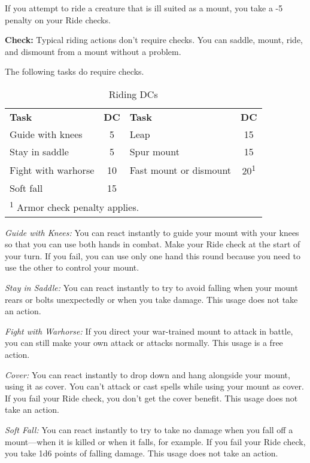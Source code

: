
If you attempt to ride a creature that is ill suited as a mount, you take a -5 
penalty on your Ride checks.

\textbf{Check:} Typical riding actions don't require checks. You can saddle, mount, 
ride, and dismount from a mount without a problem.

The following tasks do require checks.

\begin{table}[htb]
\caption{Riding DCs}
\centering
\begin{tabular}{l c l c}
\textbf{Task} & \textbf{DC} & \textbf{Task} & \textbf{DC}\\
Guide with knees & 5 & Leap & 15\\
Stay in saddle & 5 & Spur mount & 15\\
Fight with warhorse & 10 & Fast mount or dismount & 20\textsuperscript{1}\\
Soft fall & 15 & & \\
\multicolumn{4}{l}{\textsuperscript{1} Armor check penalty applies.}\\
\end{tabular}
\end{table}

\textit{Guide with Knees:} You can react instantly to guide your mount with your 
knees so that you can use both hands in combat. Make your Ride check at the start 
of your turn. If you fail, you can use only one hand this round because you need 
to use the other to control your mount.

\textit{Stay in Saddle:} You can react instantly to try to avoid falling when your 
mount rears or bolts unexpectedly or when you take damage. This usage does not 
take an action.

\textit{Fight with Warhorse:} If you direct your war-trained mount to attack in 
battle, you can still make your own attack or attacks normally. This usage is a 
free action.

\textit{Cover:} You can react instantly to drop down and hang alongside your mount, 
using it as cover. You can't attack or cast spells while using your mount as cover. 
If you fail your Ride check, you don't get the cover benefit. This usage does not 
take an action.

\textit{Soft Fall:} You can react instantly to try to take no damage when you fall 
off a mount---when it is killed or when it falls, for example. If you fail your 
Ride check, you take 1d6 points of falling damage. This usage does not take an 
action.


